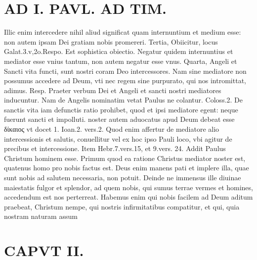 \documentclass{article}
\begin{document}
\begin{pages}
\section*{AD I. PAVL. AD TIM. }
\marginpar{[ p.58 ]}\pstart Illic enim intercedere nihil aliud significat quam internuntium et medium esse: non autem ipsam Dei gratiam nobis promereri. Tertia, Obiicitur, locus Galat.3.v,2o.Respo. Est sophistica obiectio. Negatur quidem internuntius et mediator esse vnius tantum, non autem negatur esse vnus. Quarta, Angeli et Sancti vita functi, sunt nostri coram Deo intercessores. Nam sine mediatore non possumus accedere ad Deum, vti nec regem sine purpurato, qui nos intromittat, adimus. Resp. Praeter verbum Dei et Angeli et sancti nostri mediatores inducuntur. Nam de Angelis nominatim vetat Paulus ne colantur. Coloss.2. De sanctis vita iam defunctis ratio prohibet, quod et ipsi mediatore egent: neque fuerunt sancti et impolluti. noster autem aduocatus apud Deum debeat esse δίκαιος vt docet 1. Ioan.2. vers.2. Quod enim affertur de mediatore alio intercessionis et salutis, conuellitur vel ex hoc ipso Pauli loco, vbi agitur de precibus et intercessione. Item Hebr.7.vers.15, et 9.vers. 24. Addit Paulus Christum hominem esse. Primum quod ea ratione Christus mediator noster est, quatenus homo pro nobis factus est. Deus enim manens pati et implere illa, quae sunt nobis ad salutem necessaria, non potuit. Deinde ne immensus ille diuinae maiestatis fulgor et splendor, ad quem nobis, qui sumus terrae vermes et homines, accedendum est nos perterreat. Habemus enim qui nobis facilem ad Deum aditum praebeat, Christum nempe, qui nostris infirmitatibus compatitur, et qui, quia nostram naturam assum\pend
\section*{CAPVT  II. }
\marginpar{[ p.58 ]}\pstart {}
{}

\end{pages}
\end{document}
